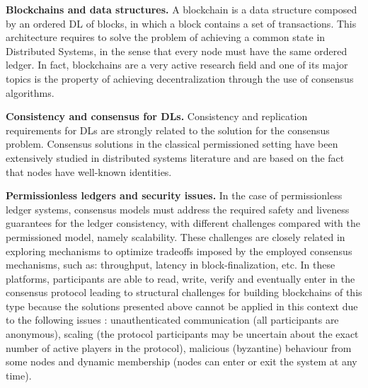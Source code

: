\textbf{Blockchains and data structures.} A blockchain is a data structure composed by an ordered \gls{DL} of blocks, in which a block contains a set of transactions. This architecture requires to solve the problem of achieving a common state in Distributed Systems, in the sense that every node must have the same ordered ledger. In fact, blockchains are a very active research field \cite{Blockchain_Consensus_Algorithms-A_Survey, the_blockchain_state_of_the_art} and one of its major topics is the property of achieving decentralization through the use of consensus algorithms. %

\textbf{Consistency and consensus for DLs.} Consistency and replication requirements for \gls{DL}s are strongly related to the solution for the consensus problem. Consensus solutions in the classical permissioned setting have been extensively studied in distributed systems literature \cite{rbft, pbft, zyzzyva_speculative_bft, byzantine_generals_problem, fast_bft} and are based on the fact that nodes have well-known identities.

\textbf{Permissionless ledgers and security issues.} In the case of permissionless ledger systems, consensus models must address the required safety and liveness guarantees for the ledger consistency, with different challenges compared with the permissioned model, namely scalability. These challenges are closely related in exploring mechanisms to optimize tradeoffs imposed by the employed consensus mechanisms, such as: throughput, latency in block-finalization, etc. In these platforms, participants are able to read, write, verify and eventually enter in the consensus protocol leading to structural challenges for building blockchains of this type because the solutions presented above cannot be applied in this context due to the following issues \cite{Rethinking_Large-Scale_Consensus}: unauthenticated communication (all participants are anonymous), scaling (the protocol participants may be uncertain about the exact number of active players in the protocol), malicious (byzantine) behaviour from some nodes and dynamic membership (nodes can enter or exit the system at any time).

